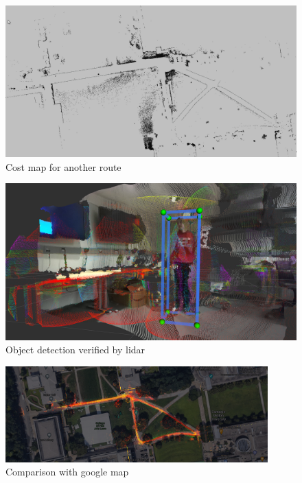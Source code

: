\documentclass[balance,upint,subscriptcorrection,varvw,nofoot, mathalfa=cal=boondoxo,spanish,french,vietnamese,russian,greek,pdf-a,fontspec,colorlinks]{asmeconf}
\begin{document}
\begin{figure}
	\centering\includegraphics[width=0.7\linewidth]{Hunts_UC_2D.png}
	\caption{Cost map for another route}\label{path_plan2}
	\end{figure}
 
\begin{figure}
\centering\includegraphics[width=0.7\linewidth]{obj_det.png}
\caption{Object detection verified by lidar}\label{obj_det}
\end{figure}




\begin{figure}
	\center
	\includegraphics[width=0.9\textwidth]{map_psed_hunt.png}
	\caption{Comparison with google map}\label{hunt}
	\end{figure}





\end{document}
